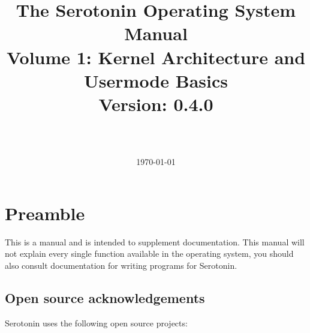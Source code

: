 \documentclass[11pt,a4paper]{article}
\title{
	\textbf{\Huge The Serotonin Operating System Manual} \\
	\large{Volume 1: Kernel Architecture and Usermode Basics} \\
	\vspace{0.5cm}
	\vspace{0.3cm}
	Version: 0.4.0 \\
	\vspace{0.5cm}
	\textit{} \\
	\date{\today}
}
\author{}
\begin{document}
	\maketitle
	\tableofcontents
	\newpage

	\section{Preamble}
	This is a manual and is intended to supplement documentation. This manual will not explain every single function available in the operating system, you should also consult documentation for writing programs for Serotonin.

	\subsection{Open source acknowledgements}
	Serotonin uses the following open source projects:
\end{document}
